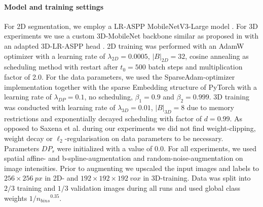     \paragraph{\textbf{Model and training settings}}
    For 2D segmentation, we employ a LR-ASPP MobileNetV3-Large model \cite{howard2019searching}. For 3D experiments we use a custom 3D-MobileNet backbone similar as proposed in \cite{sandler2018mobilenetv2} with an adapted 3D-LR-ASPP head \cite{hempe2022opportunistic}.
    2D training was performed with an AdamW \cite{loshchilov2017decoupled} optimizer with a learning rate of \(\lambda_{2D}=0.0005\),
    \(\lvert B \rvert_{2D}=32\), cosine annealing \cite{loshchilov2016sgdr} as scheduling method with restart after \(t_0=500\) batch steps and multiplication factor of 2.0.
    For the data parameters, we used the SparseAdam-optimizer implementation together with the sparse Embedding structure of PyTorch with a learning rate of \(\lambda_{DP}=0.1\), no scheduling, \(\beta_1=0.9\) and \(\beta_2=0.999\).
    3D training was conducted with learning rate of \(\lambda_{3D}=0.01\), \(\lvert B \rvert_{3D}=8\) due to memory restrictions and exponentially decayed scheduling with factor of \(d=0.99\). As opposed to Saxena et al. \cite{saxena2019data} during our experiments we did not find weight-clipping, weight decay or \(\ell_{2}\)-regularisation on data parameters to be necessary. Parameters \(DP_s\) were initialized with a value of 0.0.
    For all experiments, we used spatial affine- and b-spline-augmentation and random-noise-augmentation on image intensities.
    Prior to augmenting we upscaled the input images and labels to \(256\times256~px\) in 2D- and \(192\times192\times192~vox\) in 3D-training.
    Data was split into \(2/3\) training and \(1/3\) validation images during all runs and used global class weights \(1/{n_{bins}}^{0.35}\). %

